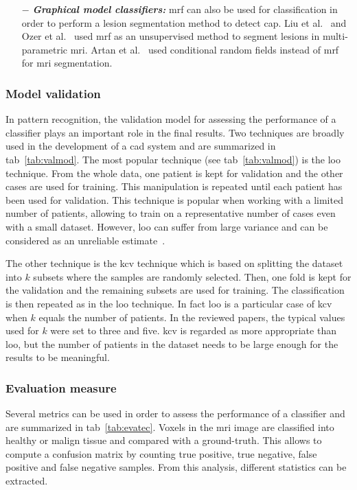 \begin{enumerate}[leftmargin=*]
\item[$-$] \textbf{\textit{Graphical model classifiers:}} \ac{mrf} can also be used for classification in order to perform a lesion segmentation method to detect \ac{cap}. Liu et al.~\cite{Liu2009} and Ozer et al.~\cite{Ozer2010} used \ac{mrf} as an unsupervised method to segment lesions in multi-parametric \ac{mri}.
Artan et al.~\cite{Artan2009,Artan2010} used conditional random fields instead of \ac{mrf} for \ac{mri} segmentation.
\end{enumerate}

\subsubsection{Model validation}

In pattern recognition, the validation model for assessing the performance of a classifier plays an important role in the final results. 
Two techniques are broadly used in the development of a \ac{cad} system and are summarized in \ac{tab}~\ref{tab:valmod}.
The most popular technique (see \ac{tab}~\ref{tab:valmod}) is the \acf{loo} technique. From the whole data, one patient is kept for validation and the other cases are used for training. This manipulation is repeated until each patient has been used for validation. This technique is popular when working with a limited number of patients, allowing to train on a representative number of cases even with a small dataset. However, \acf{loo} can suffer from large variance and can be considered as an unreliable estimate~\cite{Efron1983}.

The other technique is the \acf{kcv} technique which is based on splitting the dataset into $k$ subsets where the samples are randomly selected. Then, one fold is kept for the validation and the remaining subsets are used for training. The classification is then repeated as in the \ac{loo} technique. In fact \acf{loo} is a particular case of \acf{kcv} when $k$ equals the number of patients. In the reviewed papers, the typical values used for $k$ were set to three and five. \acf{kcv} is regarded as more appropriate than \acf{loo}, but the number of patients in the dataset needs to be large enough for the results to be meaningful.

\subsubsection{Evaluation measure}\label{subsubsec:eval}

Several metrics can be used in order to assess the performance of a classifier and are summarized in \ac{tab}~\ref{tab:evatec}.
Voxels in the \ac{mri} image are classified into healthy or malign tissue and compared with a ground-truth. This allows to compute a confusion matrix by counting true positive, true negative, false positive and false negative samples. From this analysis, different statistics can be extracted. 

